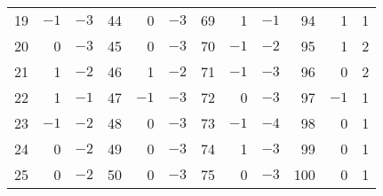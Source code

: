 \documentclass[12pt]{article}
\begin{document}
\begin{tabular}{|r|r|r|r|r|r|r|r|r|r|r|r|}
19 & $-1$ & $-3$ & 44 & 0 & $-3$ & 69 & 1 & $-1$ & 94 & 1 & 1 \\
20 & 0 & $-3$ & 45 & 0 & $-3$ & 70 & $-1$ & $-2$ & 95 & 1 & 2 \\
21 & 1 & $-2$ & 46 & 1 & $-2$ & 71 & $-1$ & $-3$ & 96 & 0 & 2 \\
22 & 1 & $-1$ & 47 & $-1$ & $-3$ & 72 & 0 & $-3$ & 97 & $-1$ & 1 \\
23 & $-1$ & $-2$ & 48 & 0 & $-3$ & 73 & $-1$ & $-4$ & 98 & 0 & 1 \\
24 & 0 & $-2$ & 49 & 0 & $-3$ & 74 & 1 & $-3$ & 99 & 0 & 1 \\
25 & 0 & $-2$ & 50 & 0 & $-3$ & 75 & 0 & $-3$ & 100 & 0 & 1 \\
\end{tabular}

\end{document}
